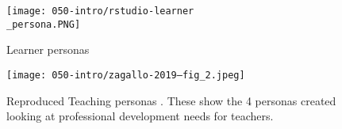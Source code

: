 \documentclass[010-intro.tex]{subfiles}
\begin{document}
    \begin{figure}[htb]
        \centering
        \texttt{[image: 050-intro/rstudio-learner\\\_persona.PNG]}
        \caption[RStudio Learner Personas]{
        Learner personas}
        \label{fig:rstudio-learner-personas}
    \end{figure}

    \begin{figure}[htb]
        \centering
        \texttt{[image: 050-intro/zagallo-2019--fig\_2.jpeg]}
        \caption[Reproduced Teaching Personas \cite{zagallo2019through}]{
        Reproduced Teaching personas \cite{zagallo2019through}.
        These show the 4 personas created looking at professional development needs for teachers.
        }
        \label{fig:teaching-personas}
    \end{figure}
\end{document}
